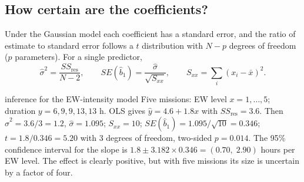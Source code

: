 \documentclass[11pt]{article}
\begin{document}
\subsection{How certain are the coefficients?}
Under the Gaussian model each coefficient has a standard error, and the ratio of estimate to standard error follows a $t$ distribution with $N-p$ degrees of freedom ($p$ parameters). For a single predictor,
\[\hat\sigma^2=\frac{SS_{\text{res}}}{N-2},\qquad SE(\hat b_1)=\frac{\hat\sigma}{\sqrt{S_{xx}}},\qquad S_{xx}=\sum_i(x_i-\bar x)^2.\]
\begin{example}{inference for the EW-intensity model}
Five missions: EW level $x=1,\ldots,5$; duration $y=6,9,9,13,13$ h. OLS gives $\hat y=4.6+1.8x$ with $SS_{\text{res}}=3.6$. Then $\hat\sigma^2=3.6/3=1.2$, $\hat\sigma=1.095$; $S_{xx}=10$; $SE(\hat b_1)=1.095/\sqrt{10}=0.346$; $t=1.8/0.346=5.20$ with 3 degrees of freedom, two-sided $p=0.014$. The 95\% confidence interval for the slope is $1.8\pm3.182\times0.346=(0.70,\;2.90)$ hours per EW level. The effect is clearly positive, but with five missions its size is uncertain by a factor of four.
\end{example}
\end{document}
